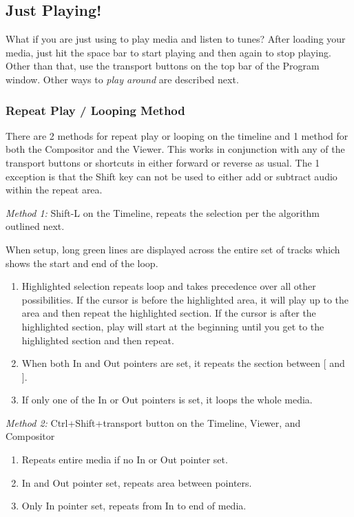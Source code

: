 \subsection{Just Playing!}%
\label{sub:just_playing_}
What if you are just using \CGG{} to play media and listen to tunes? 
After loading your media, just hit the space bar to start playing and then again to stop playing.  
Other than that, use the transport buttons on the top bar of the Program window.  
Other ways to \textit{play around} are described next. 

\subsubsection*{Repeat Play / Looping Method}%
\label{ssub:repeat_play_looping_method}

There are 2 methods for repeat play or looping on the timeline and 1 method for both the Compositor and the Viewer.  This works in conjunction with any of the transport buttons or shortcuts in either forward or reverse as usual.  The 1 exception is that the Shift key can not be used to either add or subtract audio within the repeat area.

\textit{Method 1:} Shift-L on the Timeline, repeats the selection per the algorithm outlined next.
  
When setup, long green lines are displayed across the entire set of tracks which shows the start and end of the loop.
\begin{enumerate}
    \item  Highlighted selection repeats loop and takes precedence over all other possibilities.  
        If the cursor is before the highlighted area, it will play up to the area and then repeat the highlighted section.  
        If the cursor is after the highlighted section, play will start at the beginning until you get to the
        highlighted section and then repeat.
    \item  When both In and Out pointers are set, it repeats the section between [ and ].
    \item  If only one of the In or Out pointers is set, it loops the whole media.
\end{enumerate}

\textit{Method 2:} Ctrl+Shift+transport button on the Timeline, Viewer, and Compositor

\begin{enumerate}
    \item Repeats entire media if no In or Out pointer set.
    \item  In and Out pointer set, repeats area between pointers.
    \item  Only In pointer set, repeats from In to end of media.
\end{enumerate}

